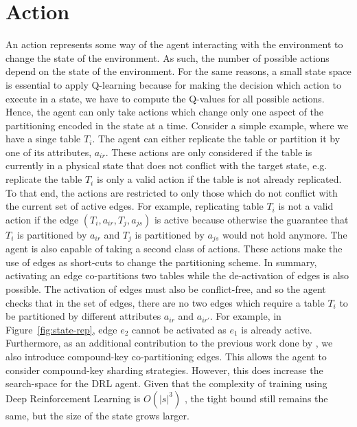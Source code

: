 \section{Action}
An action represents some way of the agent interacting with the environment to change the state of the environment. As such, the number of possible actions depend on the state of the environment. For the same reasons, a small state space is essential to apply Q-learning because for making the decision which action to execute in a state, we have to compute the Q-values for all possible actions. Hence, the agent can only take actions which change only one aspect of the partitioning encoded in the state at a time.
Consider a simple example, where we have a singe table $T_i$. The agent can either replicate the table or partition it by one of its attributes, $a_{ir}$. These actions are only considered if the table is currently in a physical state that does not conflict with the target state, e.g. replicate the table $T_i$ is only a valid action if the table is not already replicated. To that end, the actions are restricted to only those which do not conflict with the current set of active edges. For example, replicating table $T_i$ is not a valid action if the edge $(T_i,a_{ir},T_j,a_{js})$ is active because otherwise the guarantee that $T_i$ is partitioned by $a_{ir}$ and $T_j$ is partitioned by $a_{js}$ would not hold anymore.
The agent is also capable of taking a second class of actions. These actions make the use of edges as short-cuts to change the partitioning scheme. In summary, activating an edge co-partitions two tables while the de-activation of edges is also possible. The activation of edges must also be conflict-free, and so the agent checks that in the set of edges, there are no two edges which require a table $T_i$ to be partitioned by different attributes $a_{ir}$ and $a_{ir'}$. For example, in Figure~\ref{fig:state-rep}, edge $e_2$ cannot be activated as $e_1$ is already active.
Furthermore, as an additional contribution to the previous work done by \citeauthor{Hilprecht:2019:TLP:3329859.3329876}, we also introduce compound-key co-partitioning edges. This allows the agent to consider compound-key sharding strategies. However, this does increase the search-space for the DRL agent. Given that the complexity of training using Deep Reinforcement Learning is $O(|s|^3)$ \cite{DBLP:conf/aaai/KoenigS93}, the tight bound still remains the same, but the size of the state grows larger.
